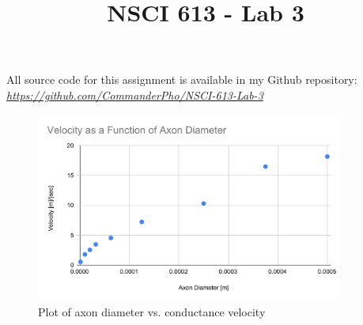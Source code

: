 \documentclass[12pt]{article}
\title{NSCI 613 - Lab 3}
\author{\phoName}
\newcommand{\githubRepoNameFormat}[1]{ \textsl{\footnotesize#1} }
\newcommand{\github}[2]{\href{#1}{\githubRepoNameFormat{#2}}}
\newcommand{\githubFromShortName}[3]{\github{https://github.com/#1/#2}{#3}}
\newcommand{\phoGithub}[2]{\githubFromShortName{CommanderPho}{#1}{#2}}
\begin{document}
\maketitle
\vfill
All source code for this assignment is available in my Github repository: \phoGithub{NSCI-613-Lab-3}{https://github.com/CommanderPho/NSCI-613-Lab-3}

\updateheaders
\clearpage








\begin{figure}[H]
\centering
\includegraphics[width=0.9\textwidth]{Results/1a-1}
\caption{\label{fig:P1a1} Plot of axon diameter vs. conductance velocity }
\end{figure}

\end{document}
